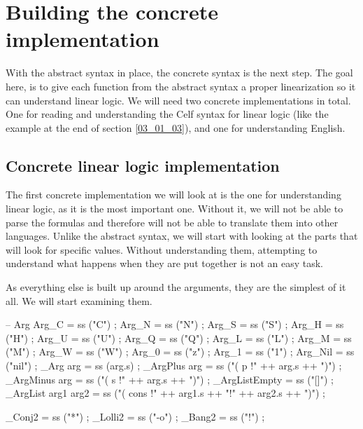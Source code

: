 \section{Building the concrete implementation}
\label{04_02}

With the abstract syntax in place, the concrete syntax is the next step. The goal here, is to give each function from the abstract syntax a proper linearization so it can understand linear logic. We will need two concrete implementations in total. One for reading and understanding the Celf syntax for linear logic (like the example at the end of section \ref{03_01_03}), and one for understanding English.

\subsection{Concrete linear logic implementation}
\label{04_02_01}

The first concrete implementation we will look at is the one for understanding linear logic, as it is the most important one. Without it, we will not be able to parse the formulas and therefore will not be able to translate them into other languages. Unlike the abstract syntax, we will start with looking at the parts that will look for specific values. Without understanding them, attempting to understand what happens when they are put together is not an easy task.

As everything else is built up around the arguments, they are the simplest of it all. We will start examining them.
\begin{lstgf}
        -- Arg
        Arg_C                           = ss ("C") ;
        Arg_N                           = ss ("N") ;
        Arg_S                           = ss ("S") ;
        Arg_H                           = ss ("H") ;
        Arg_U                           = ss ("U") ;
        Arg_Q                           = ss ("Q") ;
        Arg_L                           = ss ("L") ;
        Arg_M                           = ss ("M") ;
        Arg_W                           = ss ("W") ;
        Arg_0                           = ss ("z") ;
        Arg_1                           = ss ("1") ;
        Arg_Nil                         = ss ("nil") ;
        _Arg arg                        = ss (arg.s) ;
        _ArgPlus arg                    = ss ("( p !" ++ arg.s ++ ")") ;
        _ArgMinus arg                   = ss ("( s !" ++ arg.s ++ ")") ;
        _ArgListEmpty                   = ss ("[]") ;
        _ArgList arg1 arg2              = ss ("( cons !" ++ arg1.s ++ "!" ++ arg2.s ++ ")") ;
        
        _Conj2                          = ss ("*") ;
        _Lolli2                         = ss ("-o") ;
        _Bang2                          = ss ("!") ;
\end{lstgf}

